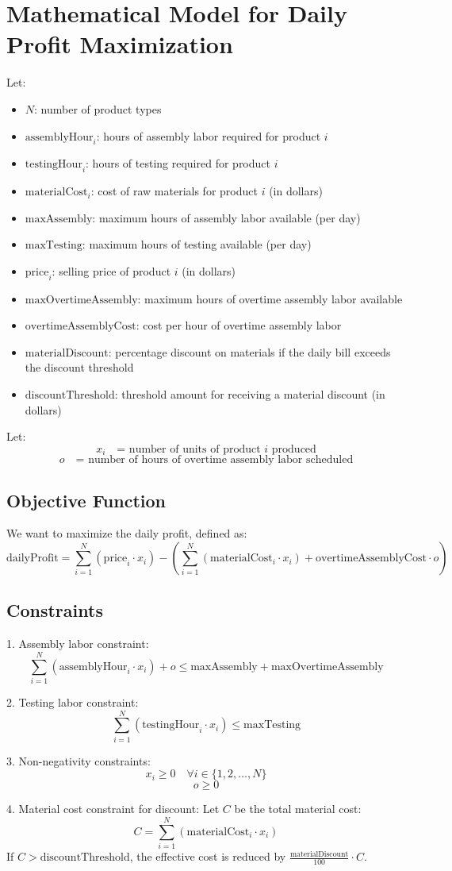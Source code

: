 \documentclass{article}
\begin{document}
\section*{Mathematical Model for Daily Profit Maximization}

Let:
\begin{itemize}
    \item \( N \): number of product types
    \item \( \text{assemblyHour}_i \): hours of assembly labor required for product \( i \)
    \item \( \text{testingHour}_i \): hours of testing required for product \( i \)
    \item \( \text{materialCost}_i \): cost of raw materials for product \( i \) (in dollars)
    \item \( \text{maxAssembly} \): maximum hours of assembly labor available (per day)
    \item \( \text{maxTesting} \): maximum hours of testing available (per day)
    \item \( \text{price}_i \): selling price of product \( i \) (in dollars)
    \item \( \text{maxOvertimeAssembly} \): maximum hours of overtime assembly labor available
    \item \( \text{overtimeAssemblyCost} \): cost per hour of overtime assembly labor
    \item \( \text{materialDiscount} \): percentage discount on materials if the daily bill exceeds the discount threshold
    \item \( \text{discountThreshold} \): threshold amount for receiving a material discount (in dollars)
\end{itemize}

Let:
\[
x_i \quad \text{= number of units of product } i \text{ produced}
\]
\[
o \quad \text{= number of hours of overtime assembly labor scheduled}
\]

\subsection*{Objective Function}
We want to maximize the daily profit, defined as:
\[
\text{dailyProfit} = \sum_{i=1}^{N} (\text{price}_i \cdot x_i) - \left( \sum_{i=1}^{N} (\text{materialCost}_i \cdot x_i) + \text{overtimeAssemblyCost} \cdot o \right)
\]

\subsection*{Constraints}
1. Assembly labor constraint:
\[
\sum_{i=1}^{N} (\text{assemblyHour}_i \cdot x_i) + o \leq \text{maxAssembly} + \text{maxOvertimeAssembly}
\]

2. Testing labor constraint:
\[
\sum_{i=1}^{N} (\text{testingHour}_i \cdot x_i) \leq \text{maxTesting}
\]

3. Non-negativity constraints:
\[
x_i \geq 0 \quad \forall i \in \{1, 2, \ldots, N\}
\]
\[
o \geq 0
\]

4. Material cost constraint for discount:
Let \( C \) be the total material cost:
\[
C = \sum_{i=1}^{N} (\text{materialCost}_i \cdot x_i)
\]
If \( C > \text{discountThreshold} \), the effective cost is reduced by \( \frac{\text{materialDiscount}}{100} \cdot C \).
\end{document}
